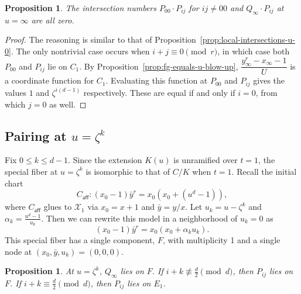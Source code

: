 \documentclass[pagesize,paper=letter]{scrartcl}
\newtheorem{proposition}[thm]{Proposition}
\theoremstyle{definition}
\theoremstyle{remark}
\def\caff{C_{\textsf{aff}}}
\def\sX{\mathcal{X}}
\begin{document}
\begin{proposition}\label{prop:local-intersections-u-infty}
  The intersection numbers $P_{00} \cdot P_{ij}$ for $ij \neq 00$ and $Q_{\infty} \cdot P_{ij}$ at $u = \infty$ are all zero.
\end{proposition}

\begin{proof}
  The reasoning is similar to that of Proposition~\ref{prop:local-intersections-u-0}. The only nontrivial case occurs when $i+j \equiv 0 \pmod{r}$, in which case both $P_{00}$ and $P_{ij}$ lie on $C_1$. By Proposition~\ref{prop:fg-equals-u-blow-up}, $\dfrac{y_\infty^r - x_\infty - 1}{U}$ is a coordinate function for $C_1$. Evaluating this function at $P_{00}$ and $P_{ij}$ gives the values $1$ and $\zeta^{i(d-1)}$ respectively. These are equal if and only if $i = 0$, from which $j = 0$ as well.
\end{proof}

\subsection{Pairing at $u = \zeta^k$}
\label{sec:pairing-at-u-1}

Fix $0 \leq k \leq d-1$. Since the extension $K(u)$ is unramified over $t = 1$, the special fiber at $u = \zeta^k$ is isomorphic to that of $C/K$ when $t = 1$. Recall the initial chart 
\[
\caff: (x_0 - 1) \bar{y}^r = x_0(x_0 + (u^d - 1)),
\]
where $\caff$ glues to $\sX_1$ via $x_0 = x + 1$ and $\bar{y} = y/x$. Let $u_k = u - \zeta^k$ and $\alpha_k = \frac{u^d - 1}{u_k}$. Then we can rewrite this model in a neighborhood of $u_k = 0$ as
\[
(x_0 - 1) \bar{y}^r = x_0(x_0 + \alpha_ku_k).
\]
This special fiber has a single component, $F$, with multiplicity 1 and a single node at $(x_0, \bar{y}, u_k) = (0,0,0)$.
\begin{proposition}\label{prop:points-on-components-u-zeta-k}
  At $u=\zeta^k$, $Q_\infty$ lies on $F$. If $i+k \not\equiv \frac{d}{2} \pmod{d}$, then $P_{ij}$ lies on $F$. If $i + k \equiv \frac{d}{2} \pmod{d}$, then $P_{ij}$ lies on $E_1$.
\end{proposition}
\end{document}
